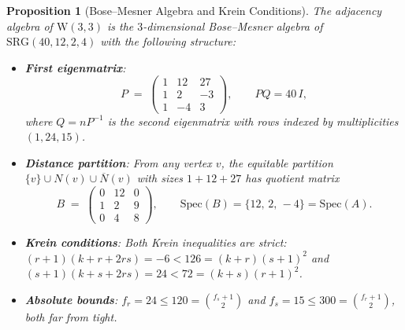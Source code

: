 \documentclass[12pt,a4paper]{article}
\newtheorem{proposition}[theorem]{Proposition}
\newcommand{\W}{\mathrm{W}(3,3)}
\begin{document}
\begin{proposition}[Bose--Mesner Algebra and Krein Conditions]\label{prop:bosemesner}
The adjacency algebra of $\W$ is the $3$-dimensional Bose--Mesner algebra of
$\mathrm{SRG}(40,12,2,4)$ with the following structure:
\begin{itemize}
  \item \textbf{First eigenmatrix}:
        \[
          P \;=\;
          \begin{pmatrix}
            1 & 12 & 27 \\
            1 & 2 & -3 \\
            1 & -4 & 3
          \end{pmatrix},
          \qquad
          PQ = 40\,I,
        \]
        where $Q = nP^{-1}$ is the second eigenmatrix with
        rows indexed by multiplicities $(1, 24, 15)$.
  \item \textbf{Distance partition}: From any vertex $v$, the equitable partition
        $\{v\} \cup N(v) \cup \overline{N}(v)$ with sizes $1 + 12 + 27$ has
        quotient matrix
        \[
          B \;=\;
          \begin{pmatrix}
            0 & 12 & 0 \\
            1 & 2 & 9 \\
            0 & 4 & 8
          \end{pmatrix},
          \qquad \mathrm{Spec}(B) = \{12,\, 2,\, -4\} = \mathrm{Spec}(A).
        \]
  \item \textbf{Krein conditions}: Both Krein inequalities are strict:
        $(r{+}1)(k{+}r{+}2rs) = -6 < 126 = (k{+}r)(s{+}1)^2$ and
        $(s{+}1)(k{+}s{+}2rs) = 24 < 72 = (k{+}s)(r{+}1)^2$.
  \item \textbf{Absolute bounds}: $f_r = 24 \le 120 = \binom{f_s+1}{2}$ and
        $f_s = 15 \le 300 = \binom{f_r+1}{2}$, both far from tight.
\end{itemize}
\end{proposition}
\end{document}
